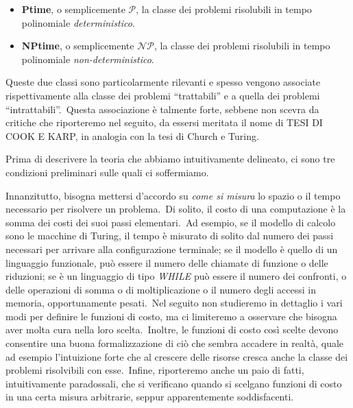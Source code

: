 \begin{itemize}
    \item\textbf{Ptime}, o semplicemente $\mathcal{P}$, la classe dei problemi risolubili in tempo polinomiale \textit{deterministico}.
    \item\textbf{NPtime}, o semplicemente $\mathcal{NP}$, la classe dei problemi risolubili in tempo polinomiale \textit{non-deterministico}.
\end{itemize}

\noindent Queste due classi sono particolarmente rilevanti e spesso vengono associate rispettivamente alla classe dei problemi ``trattabili'' e a quella dei problemi ``intrattabili''.\
Questa associazione è talmente forte, sebbene non scevra da critiche che riporteremo nel seguito, da essersi meritata il nome di {\footnotesize TESI DI COOK E KARP}, in analogia con la tesi di Church e Turing.\

\medskip
\noindent Prima di descrivere la teoria che abbiamo intuitivamente delineato, ci sono tre condizioni preliminari sulle quali ci soffermiamo.

Innanzitutto, bisogna mettersi d'accordo su \textit{come si misura} lo spazio o il tempo necessario per risolvere un problema.\
Di solito, il costo di una computazione è la somma dei costi dei suoi passi elementari.\
Ad esempio, se il modello di calcolo sono le macchine di Turing, il tempo è misurato di solito dal numero dei passi necessari per arrivare alla configurazione terminale; se il modello è quello di un linguaggio funzionale, può essere il numero delle chiamate di funzione o delle riduzioni; se è un linguaggio di tipo \textit{\footnotesize WHILE} può essere il numero dei confronti, o delle operazioni di somma o di moltiplicazione o il numero degli accessi in memoria, opportunamente pesati.\
Nel seguito non studieremo in dettaglio i vari modi per definire le funzioni di costo, ma ci limiteremo a osservare che bisogna aver molta cura nella loro scelta.\
Inoltre, le funzioni di costo così scelte devono consentire una buona formalizzazione di ciò che sembra accadere in realtà, quale ad esempio l'intuizione forte che al crescere delle risorse cresca anche la classe dei problemi risolvibili con esse.\
Infine, riporteremo anche un paio di fatti, intuitivamente paradossali, che si verificano quando si scelgano funzioni di costo in una certa misura arbitrarie, seppur apparentemente soddisfacenti.\

